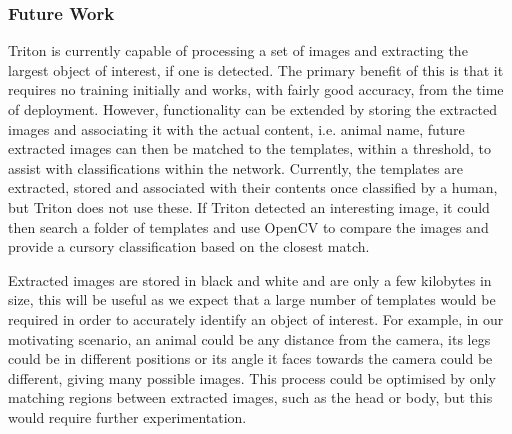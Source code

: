 	\subsubsection{Future Work}
		Triton is currently capable of processing a set of images and extracting the largest object of interest, if one is detected. The primary benefit of this is that it requires no training initially and works, with fairly good accuracy, from the time of deployment. However, functionality can be extended by storing the extracted images and associating it with the actual content, i.e. animal name, future extracted images can then be matched to the templates, within a threshold, to assist with classifications within the network. Currently, the templates are extracted, stored and associated with their contents once classified by a human, but Triton does not use these. If Triton detected an interesting image, it could then search a folder of templates and use OpenCV to compare the images and provide a cursory classification based on the closest match. 
		
		Extracted images are stored in black and white and are only a few kilobytes in size, this will be useful as we expect that a large number of templates would be required in order to accurately identify an object of interest. For example, in our motivating scenario, an animal could be any distance from the camera, its legs could be in different positions or its angle it faces towards the camera could be different, giving many possible images. This process could be optimised by only matching regions between extracted images, such as the head or body, but this would require further experimentation.


